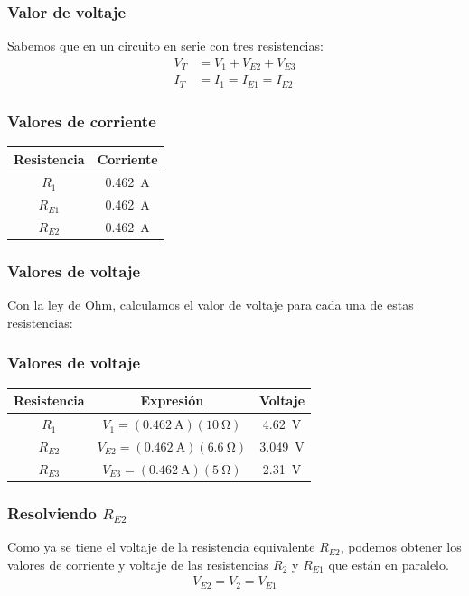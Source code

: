 \documentclass[14pt]{beamer}
\begin{document}
\begin{frame}
\frametitle{Valor de voltaje}
Sabemos que en un circuito en serie con tres resistencias:
\pause
\begin{align*}
V_{T} &= V_{1} + V_{E2} + V_{E3} \\[1em]
I_{T} &= I_{1} = I_{E1} = I_{E2}
\end{align*}
\end{frame}
\begin{frame}
\frametitle{Valores de corriente}
\begin{table}[H]
\centering
\begin{tabular}{c | c }
Resistencia & Corriente \\ \hline
$R_{1}$ & \SI{0.462}{\ampere} \\ \hline
$R_{E1}$ & \SI{0.462}{\ampere} \\ \hline
$R_{E2}$ & \SI{0.462}{\ampere} \\ \hline
\end{tabular}
\end{table}
\end{frame}
\begin{frame}
\frametitle{Valores de voltaje}
Con la ley de Ohm, calculamos el valor de voltaje para cada una de estas resistencias:
\end{frame}
\begin{frame}
\frametitle{Valores de voltaje}
\begin{table}[H]
\centering
\begin{tabular}{c | c | c}
Resistencia & Expresión & Voltaje \\ \hline
$R_{1}$ & $V_{1} = (\SI{0.462}{\ampere})(\SI{10}{\ohm})$ & \SI{4.62}{\volt} \\ \hline
$R_{E2}$ & $V_{E2} = (\SI{0.462}{\ampere})(\SI{6.6}{\ohm})$ & \SI{3.049}{\volt} \\ \hline
$R_{E3}$ & $V_{E3} = (\SI{0.462}{\ampere})(\SI{5}{\ohm})$ & \SI{2.31}{\volt} \\ \hline
\end{tabular}
\end{table}    
\end{frame}
\begin{frame}
\frametitle{Resolviendo $R_{E2}$}
Como ya se tiene el voltaje de la resistencia equivalente $R_{E2}$, \pause podemos obtener los valores de corriente y voltaje de las resistencias $R_{2}$ y $R_{E1}$ que están en paralelo.
\pause
\begin{align*}
V_{E2} = V_{2} = V_{E1}
\end{align*}
\end{frame}
\end{document}
